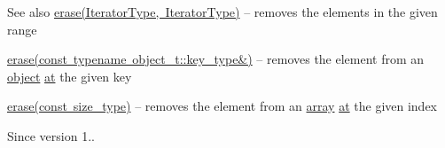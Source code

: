 \begin{DoxySeeAlso}{See also}
\mbox{\hyperlink{classnlohmann_1_1basic__json_a4b3f7eb2d4625d95a51fbbdceb7c5f39}{erase(\+Iterator\+Type, Iterator\+Type)}} -- removes the elements in the given range 

\mbox{\hyperlink{classnlohmann_1_1basic__json_a2f8484d69c55d8f2a9697a7bec29362a}{erase(const typename object\+\_\+t\+::key\+\_\+type\&)}} -- removes the element from an \mbox{\hyperlink{classnlohmann_1_1basic__json_aa13f7c0615867542ce80337cbcf13ada}{object}} \mbox{\hyperlink{classnlohmann_1_1basic__json_a73ae333487310e3302135189ce8ff5d8}{at}} the given key 

\mbox{\hyperlink{classnlohmann_1_1basic__json_a88cbcefe9a3f4d294bed0653550a5cb9}{erase(const size\+\_\+type)}} -- removes the element from an \mbox{\hyperlink{classnlohmann_1_1basic__json_aa80485befaffcadaa39965494e0b4d2e}{array}} \mbox{\hyperlink{classnlohmann_1_1basic__json_a73ae333487310e3302135189ce8ff5d8}{at}} the given index
\end{DoxySeeAlso}
\begin{DoxySince}{Since}
version 1.. 
\end{DoxySince}
\mbox{\label{classnlohmann_1_1basic__json_a4b3f7eb2d4625d95a51fbbdceb7c5f39}} 

